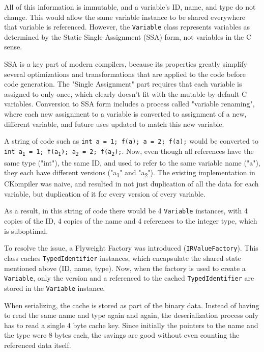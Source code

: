 \documentclass[lettersize,journal]{IEEEtran}
\begin{document}
    All of this information is immutable, and a variable's ID, name, and type do not change.
    This would allow the same variable instance to be shared everywhere that variable is referenced.
    However, the \texttt{Variable} class represents variables as determined by the Static Single Assignment (SSA) form,
    not variables in the C sense.

    SSA is a key part of modern compilers, because its properties greatly simplify several optimizations and
    transformations that are applied to the code before code generation.
    The "Single Assignment" part requires that each variable is assigned to only once, which clearly doesn't fit with
    the mutable-by-default C variables.
    Conversion to SSA form includes a process called "variable renaming", where each new assignment to a variable
    is converted to assignment of a new, different variable, and future uses updated to match this new variable.

    A string of code such as \texttt{int a = 1; f(a); a = 2; f(a);} would be converted to
    \texttt{int a\textsubscript{1} = 1; f(a\textsubscript{1}); a\textsubscript{2} = 2; f(a\textsubscript{2});}.
    Now, even though all references have the same type ("int"), the same ID, and used to refer to the same variable
    name ("a"), they each have different versions ("a\textsubscript{1}" and "a\textsubscript{2}").
    The existing implementation in CKompiler was naive, and resulted in not just duplication of all the data for each
    variable, but duplication of it for every version of every variable.

    As a result, in this string of code there would be 4 \texttt{Variable} instances, with 4 copies of the ID, 4 copies
    of the name and 4 references to the integer type, which is suboptimal.

    To resolve the issue, a Flyweight Factory was introduced (\texttt{IRValueFactory}).
    This class caches \texttt{TypedIdentifier} instances, which encapsulate the shared state mentioned above
    (ID, name, type).
    Now, when the factory is used to create a \texttt{Variable}, only the version and a referenced to the cached
    \texttt{TypedIdentifier} are stored in the \texttt{Variable} instance.

    When serializing, the cache is stored as part of the binary data.
    Instead of having to read the same name and type again and again, the deserialization process only has to read a
    single 4 byte cache key.
    Since initially the pointers to the name and the type were 8 bytes each, the savings are good without even counting
    the referenced data itself.
\end{document}
